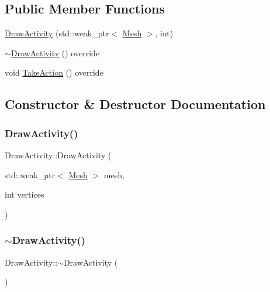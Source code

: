 \subsection*{Public Member Functions}
\begin{DoxyCompactItemize}
\item 
\mbox{\hyperlink{class_draw_activity_a5736b8aa76a0eb15f5747e04938d07c4}{Draw\+Activity}} (std\+::weak\+\_\+ptr$<$ \mbox{\hyperlink{class_mesh}{Mesh}} $>$, int)
\item 
\mbox{\hyperlink{class_draw_activity_a3128dc9b83d471657765ee09a1def183}{$\sim$\+Draw\+Activity}} () override
\item 
void \mbox{\hyperlink{class_draw_activity_a0ca36e1d0c5e3ff16fe1e33432d245bf}{Take\+Action}} () override
\end{DoxyCompactItemize}


\subsection{Constructor \& Destructor Documentation}
\mbox{\label{class_draw_activity_a5736b8aa76a0eb15f5747e04938d07c4}} 
\subsubsection{\texorpdfstring{DrawActivity()}{DrawActivity()}}
{\footnotesize\ttfamily Draw\+Activity\+::\+Draw\+Activity (\begin{DoxyParamCaption}\item[{std\+::weak\+\_\+ptr$<$ \mbox{\hyperlink{class_mesh}{Mesh}} $>$}]{mesh,  }\item[{int}]{vertices }\end{DoxyParamCaption})\hspace{0.3cm}{\ttfamily [explicit]}}

\mbox{\label{class_draw_activity_a3128dc9b83d471657765ee09a1def183}} 
\subsubsection{\texorpdfstring{$\sim$DrawActivity()}{~DrawActivity()}}
{\footnotesize\ttfamily Draw\+Activity\+::$\sim$\+Draw\+Activity (\begin{DoxyParamCaption}{ }\end{DoxyParamCaption})\hspace{0.3cm}{\ttfamily [override]}}



